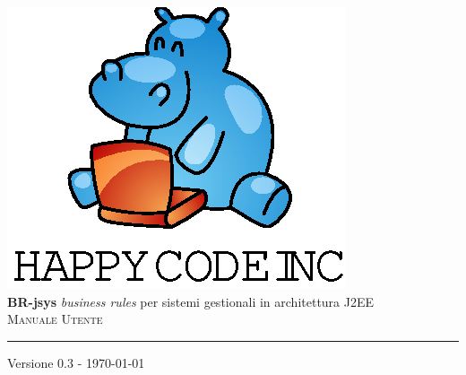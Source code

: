 \documentclass[11pt,titlepage,a4paper]{report}
\begin{document}
\newcommand{\lv}{ 0.3 } %
\newcommand{\dt}{ Manuale Utente }%
\newcommand{\Glossario}{ Glossario.1.4.pdf }

\begin{titlepage}\begin{center}
\vspace*{0.5in}
\includegraphics{logo.eps}
\vspace*{0.2in} \\
{\Large \textbf{BR-jsys}}
{\Large \emph{business rules} per sistemi gestionali in architettura J2EE } 
\vspace{2in} \\
\Huge \textsc{ \dt }
\par\rule{10cm}{0.4pt} \par {\large Versione \lv - \today} \\
\end{center}\end{titlepage}
\vspace*{0.5in}
\end{document}
